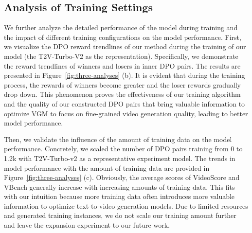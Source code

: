 \subsection{Analysis of Training Settings}
We further analyze the detailed performance of the model during training and the impact of different training configurations on the model performance. 
First, we visualize the DPO reward trendlines of our method during the training of our model (the T2V-Turbo-V2 as the representation). Specifically, we demonstrate the reward trendlines of winners and losers in inner DPO pairs. The results are presented in Figure~\ref{fig:three-analyses} (b). 
It is evident that during the training process, the rewards of winners become greater and the loser rewards gradually drop down. This phenomenon proves the effectiveness of our training algorithm and the quality of our constructed DPO pairs that bring valuable information to optimize VGM to focus on fine-grained video generation quality, leading to better model performance.  

Then, we validate the influence of the amount of training data on the model performance. Concretely, we scaled the number of DPO pairs training from 0 to 1.2k with T2V-Turbo-v2 as a representative experiment model. The trends in model performance with the amount of training data are provided in Figure~\ref{fig:three-analyses} (c). Obviously, the average scores of VideoScore and VBench generally increase with increasing amounts of training data. This fits with our intuition because more training data often introduces more valuable information to optimize text-to-video generation models. Due to limited resources and generated training instances, we do not scale our training amount further and leave the expansion experiment to our future work. 